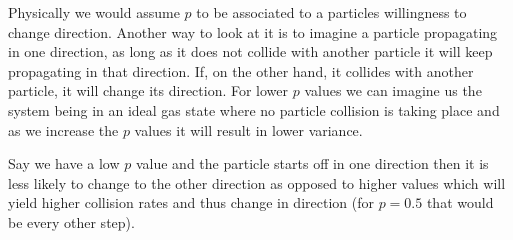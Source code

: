\documentclass{article}
\begin{document}
\begin{enumerate}[I]
Physically we would assume $p$ to be associated to a particles willingness to change direction. Another way to look at it is to imagine a particle propagating in one direction, as long as it does not collide with another particle it will keep propagating in that direction. If, on the other hand, it collides with another particle, it will change its direction. For lower $p$ values we can imagine us the system being in an ideal gas state where no particle collision is taking place and as we increase the $p$ values it will result in lower variance.

Say we have a low $p$ value and the particle starts off in one direction then it is less likely to change to the other direction as opposed to higher values which will yield higher collision rates and thus change in direction (for $p=0.5$ that would be every other step).


\end{enumerate}
\end{document}
